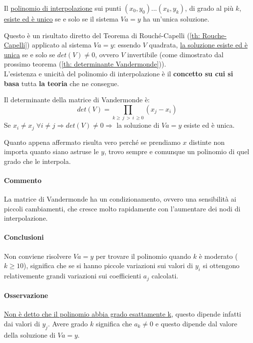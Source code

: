 \documentclass[12pt,a4paper,]{report}
\begin{document}
\begin{teorema}
    \label{th: esistenza unicita interpolazione}
    Il \underline{polinomio di interpolazione} sui punti $(x_0, y_0)...(x_k, y_k)$, di grado al più $k$, \underline{esiste ed è unico} se e solo se il sistema $Va=y$ ha un'unica soluzione.
\end{teorema}
\noindent
Questo è un risultato diretto del Teorema di Rouché-Capelli (\autoref{th: Rouche-Capelli}) applicato al sistema $Va=y$: essendo $V$ quadrata, \uline{la soluzione esiste ed è unica} se e solo se $det(V)\neq 0$, ovvero $V$ invertibile (come dimostrato dal prossimo teorema (\autoref{th: determinante Vandermonde})).\\
L'esistenza e unicità del polinomio di interpolazione è il \textbf{concetto su cui si basa} tutta \textbf{la teoria} che ne consegue.
\begin{teorema}
    \label{th: determinante Vandermonde}
    Il determinante della matrice di Vandermonde è:
    \[
    det(V) = \underset{k\ge \,j\,>\,i\,\ge0}{\prod}\left( x_j - x_i\right)
    \]
    Se $x_i \neq x_j \;\forall i \neq j \Longrightarrow det(V)\neq 0 \Longrightarrow$ la soluzione di $Va=y$ esiste ed è unica.
\end{teorema}
\begin{nota}
    Quanto appena affermato risulta vero perché se prendiamo $x$ distinte non importa quanto siano astruse le $y$, trovo sempre e comunque un polinomio di quel grado che le interpola.
\end{nota}
\paragraph{Commento}
La matrice di Vandermonde ha un condizionamento, ovvero una sensibilità ai piccoli cambiamenti, che cresce molto rapidamente con l'aumentare dei nodi di interpolazione.
\paragraph{Conclusioni}
Non conviene risolvere $Va=y$ per trovare il polinomio quando $k$ è moderato ($k\ge 10$), significa che se si hanno piccole variazioni sui valori di $y_i$ si ottengono relativemente grandi variazioni sui coefficienti $a_j$ calcolati.
\paragraph{Osservazione}
\uline{Non è detto che il polinomio abbia grado esattamente k}, questo dipende infatti dai valori di $y_j$.
Avere grado $k$ significa che $a_k\ne 0$ e questo dipende dal valore della soluzione di $Va=y$.
\end{document}
